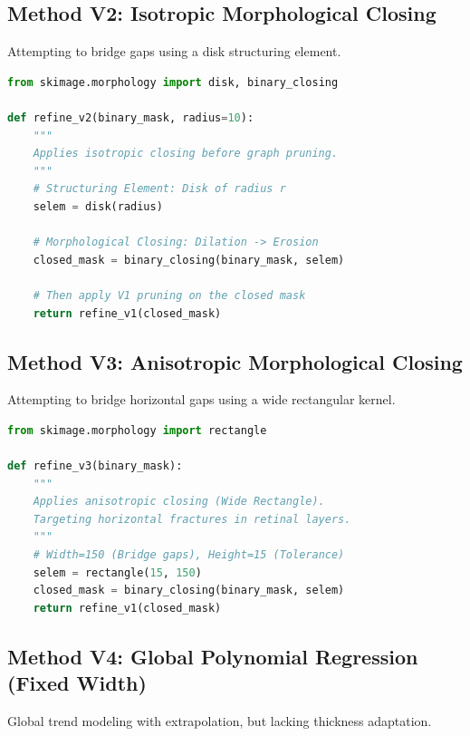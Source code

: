 \documentclass[twocolumn, 10pt, a4paper]{article}
\begin{document}
\subsection{Method V2: Isotropic Morphological Closing}
Attempting to bridge gaps using a disk structuring element.

\begin{lstlisting}[language=Python, caption=topo\_analysis\_v2.py]
from skimage.morphology import disk, binary_closing

def refine_v2(binary_mask, radius=10):
    """
    Applies isotropic closing before graph pruning.
    """
    # Structuring Element: Disk of radius r
    selem = disk(radius)
    
    # Morphological Closing: Dilation -> Erosion
    closed_mask = binary_closing(binary_mask, selem)
    
    # Then apply V1 pruning on the closed mask
    return refine_v1(closed_mask)
\end{lstlisting}

\subsection{Method V3: Anisotropic Morphological Closing}
Attempting to bridge horizontal gaps using a wide rectangular kernel.

\begin{lstlisting}[language=Python, caption=topo\_analysis\_v3.py]
from skimage.morphology import rectangle

def refine_v3(binary_mask):
    """
    Applies anisotropic closing (Wide Rectangle).
    Targeting horizontal fractures in retinal layers.
    """
    # Width=150 (Bridge gaps), Height=15 (Tolerance)
    selem = rectangle(15, 150)
    closed_mask = binary_closing(binary_mask, selem)
    return refine_v1(closed_mask)
\end{lstlisting}

\subsection{Method V4: Global Polynomial Regression (Fixed Width)}
Global trend modeling with extrapolation, but lacking thickness adaptation.
\end{document}
